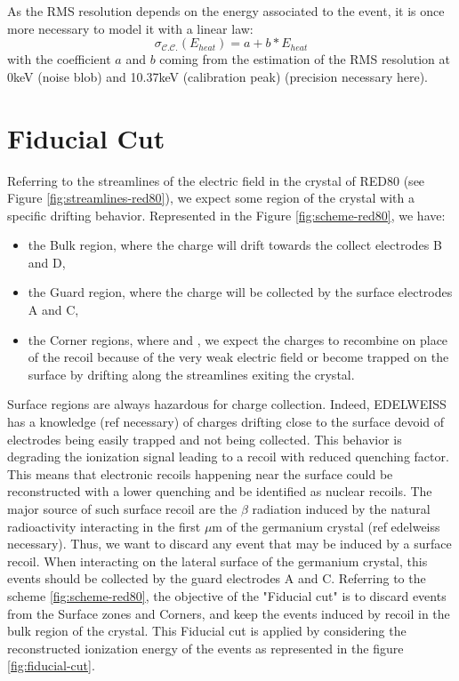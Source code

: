 As the RMS resolution depends on the energy associated to the event, it is once more necessary to model it with a linear law:
\begin{equation}
\sigma_{\mathcal{C.C.}}\left(E_{heat}\right)
=
a + b*E_{heat}
\end{equation}
with the coefficient $a$ and $b$ coming from the estimation of the RMS resolution at 0keV (noise blob) and 10.37keV (calibration peak) (precision necessary here).


\section{Fiducial Cut}
\label{par:fiducial-cut}

Referring to the streamlines of the electric field in the crystal of RED80 (see Figure \ref{fig:streamlines-red80}), we expect some region of the crystal with a specific drifting behavior. Represented in the Figure \ref{fig:scheme-red80}, we have:
\begin{itemize}
	\item the Bulk region, where the charge will drift towards the collect electrodes B and D,
	\item the Guard region, where the charge will be collected by the surface electrodes A and C,
	\item the Corner regions, where and , we expect the charges to recombine on place of the recoil because of the very weak electric field or become trapped on the surface by drifting along the streamlines exiting the crystal.
\end{itemize}

Surface regions are always hazardous for charge collection. Indeed, EDELWEISS has a knowledge (ref necessary) of charges drifting close to the surface devoid of electrodes being easily trapped and not being collected. This behavior is degrading the ionization signal leading to a recoil with reduced quenching factor. This means that electronic recoils happening near the surface could be reconstructed with a lower quenching and be identified as nuclear recoils. The major source of such surface recoil are the $\beta$ radiation induced by the natural radioactivity interacting in the first $\mu$m of the germanium crystal (ref edelweiss necessary). Thus, we want to discard any event that may be induced by a surface recoil. When interacting on the lateral surface of the germanium crystal, this events should be collected by the guard electrodes A and C. Referring to the scheme \ref{fig:scheme-red80}, the objective of the "Fiducial cut" is to discard events from the Surface zones and Corners, and keep the events induced by recoil in the bulk region of the crystal. This Fiducial cut is applied by considering the reconstructed ionization energy of the events as represented in the figure \ref{fig:fiducial-cut}.

